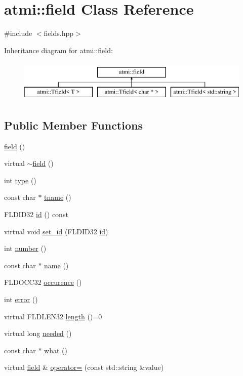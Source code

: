 \hypertarget{classatmi_1_1field}{\section{atmi\+:\+:field Class Reference}
\label{classatmi_1_1field}
}


{\ttfamily \#include $<$fields.\+hpp$>$}

Inheritance diagram for atmi\+:\+:field\+:\begin{figure}[H]
\begin{center}
\leavevmode
\includegraphics[height=2.000000cm]{classatmi_1_1field}
\end{center}
\end{figure}
\subsection*{Public Member Functions}
\begin{DoxyCompactItemize}
\item 
\hyperlink{classatmi_1_1field_ad704c8d557c86b84b2d37bdf2cbdc36c}{field} ()
\item 
virtual \hyperlink{classatmi_1_1field_a6f91cba3fca0a77fb7ad229187d689b9}{$\sim$field} ()
\item 
int \hyperlink{classatmi_1_1field_a717c701f07a784f471abb44d7bc95048}{type} ()
\item 
const char $\ast$ \hyperlink{classatmi_1_1field_a7d6260dd6f7c3c44de29190c2dfd546e}{tname} ()
\item 
F\+L\+D\+I\+D32 \hyperlink{classatmi_1_1field_a89ff294c8276c6a882f510a8f95ac372}{id} () const 
\item 
virtual void \hyperlink{classatmi_1_1field_a1d95c3b0f4ae491037ef51b8586a0083}{set\+\_\+id} (F\+L\+D\+I\+D32 \hyperlink{classatmi_1_1field_a89ff294c8276c6a882f510a8f95ac372}{id})
\item 
int \hyperlink{classatmi_1_1field_aa71d28f3df8490e9ed016607f857fae1}{number} ()
\item 
const char $\ast$ \hyperlink{classatmi_1_1field_a0fbc5a958a0af8286e339b088ee69bc8}{name} ()
\item 
F\+L\+D\+O\+C\+C32 \hyperlink{classatmi_1_1field_a161b9b7037c49fbcf86518fcb35e779c}{occurence} ()
\item 
int \hyperlink{classatmi_1_1field_a6d8db988f58f3779b0ef528a11b3466f}{error} ()
\item 
virtual F\+L\+D\+L\+E\+N32 \hyperlink{classatmi_1_1field_a296771293135085d91aa9aefd108d44d}{length} ()=0
\item 
virtual long \hyperlink{classatmi_1_1field_aef2940ef13d554b2a0090ea4052529d8}{needed} ()
\item 
const char $\ast$ \hyperlink{classatmi_1_1field_a396b41ad5ae2b1df362e446c5f090640}{what} ()
\item 
virtual \hyperlink{classatmi_1_1field}{field} \& \hyperlink{classatmi_1_1field_addd031ecbcf2026116cf6e03534ac862}{operator=} (const std\+::string \&value)
\end{DoxyCompactItemize}
